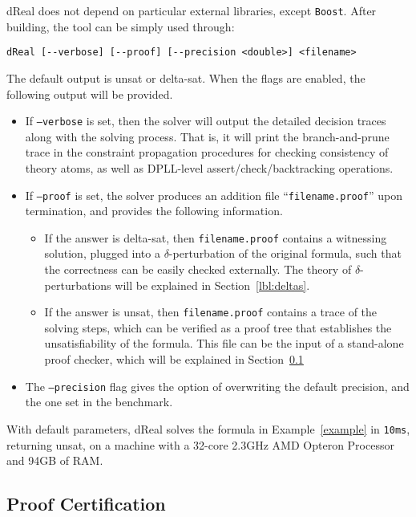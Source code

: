 \documentclass[envcountsect]{llncs}
\begin{document}
{\sf dReal} does not depend on particular external libraries, except
{\tt Boost}. After building, the tool can be simply used through:
\begin{verbatim}
dReal [--verbose] [--proof] [--precision <double>] <filename>
\end{verbatim}
The default output is {\sf unsat} or {\sf delta-sat}. When the flags are
enabled, the following output will be provided.
\begin{itemize}
 \item If {\tt --verbose} is set, then the solver will output the detailed
decision traces along with the solving process. That is, it will print the
branch-and-prune trace in the constraint propagation procedures for checking
consistency of theory atoms, as well as DPLL-level
assert/check/backtracking operations.
\item If {\tt --proof} is set, the solver produces an addition file
``{\tt filename.proof}'' upon termination, and provides the following
information.
\begin{itemize}
\item If the answer is {\sf delta-sat},
then {\tt filename.proof} contains a witnessing solution, plugged into a
$\delta$-perturbation of the original formula, such
that the correctness can be easily checked externally. The theory of
$\delta$-perturbations will be explained in Section~\ref{lbl:deltas}.

\item If the answer is {\sf unsat}, then {\tt filename.proof} contains a trace
of the solving steps, which can be verified as a proof tree that establishes the
unsatisfiability of the formula. This file can be the input of a stand-alone
proof checker, which will be explained in Section~\ref{proof}
\end{itemize}
\item The {\tt --precision} flag gives the option of overwriting the
default precision, and the one set in the benchmark.
\end{itemize}

\begin{example}
With default parameters, {\sf dReal} solves the formula in
Example~\ref{example} in {\tt 10ms}, returning {\sf unsat}, on a machine with
a 32-core 2.3GHz AMD Opteron Processor and 94GB of RAM.
\end{example}

\subsection{Proof Certification}\label{proof}
\end{document}
